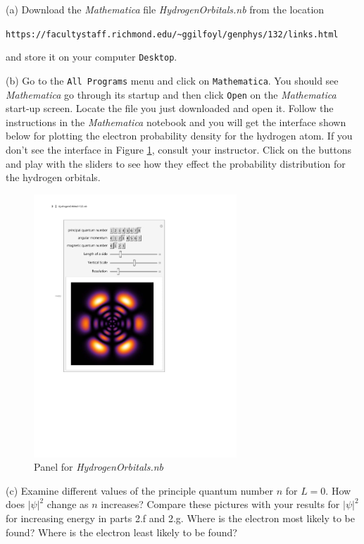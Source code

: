 (a) Download the {\it Mathematica} file {\it HydrogenOrbitals.nb} from the location

\begin{center}
{\verb!https://facultystaff.richmond.edu/~ggilfoyl/genphys/132/links.html!}
\end{center}
\noindent and store it on your computer {\tt Desktop}.

(b) Go to the {\tt All Programs} menu and click on {\tt Mathematica}.
You should see {\it Mathematica} go through its startup and then click {\tt Open}
on the {\it Mathematica} start-up screen.
Locate the file you just downloaded and open it.
Follow the instructions in the {\it Mathematica} notebook
and you will get the interface shown below for plotting
the electron probability density for the hydrogen atom.
If you don't see the interface in Figure \ref{fig:gui}, consult your instructor.
Click on the buttons and play with the sliders to see how they effect the 
probability distribution for the hydrogen orbitals.
\begin{figure}[h!]
\begin{center}
\includegraphics[width=3.0in]{qmProbability/HydrogenOrbitals132.pdf}
\caption{Panel for {\it HydrogenOrbitals.nb}}\label{fig:gui}
\end{center}
\end{figure}

(c) Examine different values of the principle quantum number $n$ for $L=0$.
How does $|\psi|^2$ change as $n$ increases? Compare these pictures with your results for 
$|\psi|^2$ for increasing energy in parts 2.f and 2.g.
Where is the electron most likely to be found?
Where is the electron least likely to be found?
\vspace{3.0cm}

